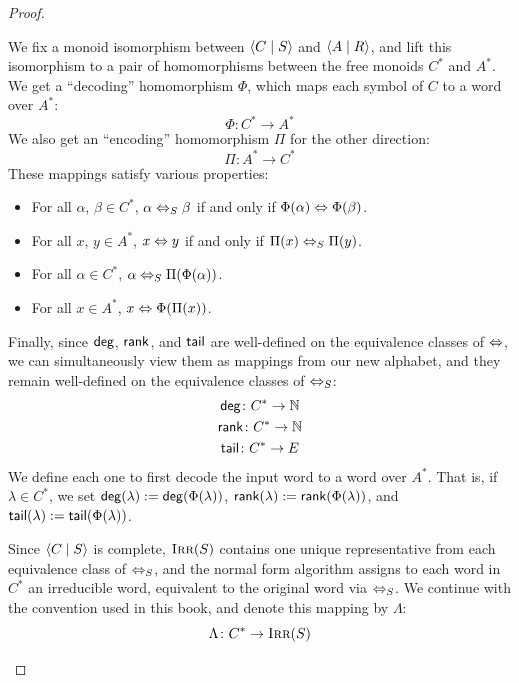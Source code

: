 \documentclass[../generics]{subfiles}
\begin{document}
\begin{proof}
\begin{definition}\label{def:tpqa psi xi}
We fix a monoid isomorphism between $\langle C \mid S\rangle$ and $\langle A \mid R\rangle$, and lift this isomorphism to a pair of homomorphisms between the free monoids $C^*$ and $A^*$. We get a ``decoding'' homomorphism $\Phi$, which maps each symbol of $C$ to a word over $A^*$:
\[
\Phi\colon C^* \rightarrow A^*
\]
We also get an ``encoding'' homomorphism $\Pi$ for the other direction:
\[
\Pi\colon A^* \rightarrow C^*
\]
These mappings satisfy various properties:
\begin{itemize}
\item For all $\alpha$, $\beta \in C^*$, $\alpha \Leftrightarrow_{S} \beta$ if and only if $\Phi(\alpha) \Leftrightarrow \Phi(\beta)$.
\item For all $x$, $y \in A^*$, $x \Leftrightarrow y$ if and only if $\Pi(x) \Leftrightarrow_{S} \Pi(y)$.
\item For all $\alpha \in C^*$, $\alpha \Leftrightarrow_{S} \Pi(\Phi(\alpha))$.
\item For all $x \in A^*$, $x \Leftrightarrow \Phi(\Pi(x))$.
\end{itemize}
Finally, since $\mathsf{deg}$, $\mathsf{rank}$, and $\mathsf{tail}$ are well-defined on the equivalence classes of $\Leftrightarrow$, we can simultaneously view them as mappings from our new alphabet, and they remain well-defined on the equivalence classes of $\Leftrightarrow_S$:
\begin{gather*}
\mathsf{deg}\colon C^* \rightarrow \mathbb{N} \\
\mathsf{rank}\colon C^* \rightarrow \mathbb{N} \\
\mathsf{tail}\colon C^* \rightarrow E
\end{gather*}
We define each one to first decode the input word to a word over $A^*$. That is, if $\lambda \in C^*$, we set $\mathsf{deg}(\lambda) := \mathsf{deg}(\Phi(\lambda))$, $\mathsf{rank}(\lambda) := \mathsf{rank}(\Phi(\lambda))$, and $\mathsf{tail}(\lambda) := \mathsf{tail}(\Phi(\lambda))$.
\end{definition}

\begin{definition}
Since $\langle C \mid S\rangle$ is complete, $\textsc{Irr}(S)$ contains one unique representative from each equivalence class of $\Leftrightarrow_S$, and the normal form algorithm assigns to each word in $C^*$ an irreducible word, equivalent to the original word via $\Leftrightarrow_{S}$. We continue with the convention used in this book, and denote this mapping by $\Lambda$:
\[
\Lambda\colon C^* \rightarrow \textsc{Irr}(S)
\]
\end{definition}


\end{proof}
\end{document}
